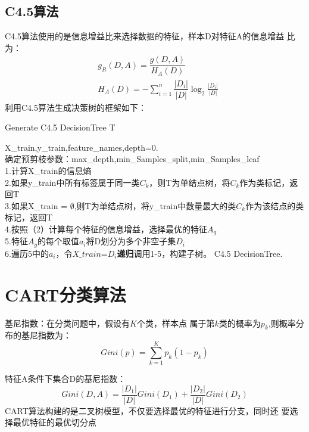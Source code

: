 \documentclass{SHUarticle}
\begin{document}
\subsection{C4.5算法}
C4.5算法使用的是信息增益比来选择数据的特征，样本D对特征A的信息增益
比为：
\begin{equation}
	\begin{aligned}
		& g_R(D,A) = \dfrac{g(D,A)}{H_A(D)}\\
		& H_A(D) = -\sum\limits_{i=1}^n \dfrac{|D_i|}{|D|}\log_2\frac{|D_i|}{|D|}
	\end{aligned}
\end{equation}
利用C4.5算法生成决策树的框架如下：
\begin{algorithm}
	\caption{Generate C4.5 DecisionTree T }
	\label{algo:ref}
	\begin{algorithmic}[1]
		\REQUIRE X\_train,y\_train,feature\_names,depth=0.  %
		\ENSURE ~\\           %
		  确定预剪枝参数：max\_depth,min\_Samples\_split,min\_Samples\_leaf\\
		\STATE
		  1.计算X\_train的信息熵\\
		  2.如果y\_train中所有标签属于同一类$C_k$，则T为单结点树，将$C_k$作为类标记，返回T\\
		  3.如果X\_train = $\emptyset$,则T为单结点树，将y\_train中数量最大的类$C_k$作为该结点的类标记，返回T\\
		  4.按照（2）计算每个特征的信息增益，选择最优的特征$A_g$\\
		  5.特征$A_g$的每个取值$a_i$将D划分为多个非空子集$D_i$\\
		  6.遍历5中的$a_i$，令$X\_train$=$D_i$\textbf{递归}调用1-5，构建子树。
		\ENDWHILE
		\RETURN C4.5 DecisionTree.  %
	\end{algorithmic}
\end{algorithm}
\section{CART分类算法}
\begin{definition}
	基尼指数：在分类问题中，假设有$K$个类，样本点
	属于第$k$类的概率为$p_k$,则概率分布的基尼指数为：
	\[Gini(p)=\sum\limits_{k=1}^Kp_k(1-p_k)\]
\end{definition}
特征A条件下集合D的基尼指数：
\[Gini(D,A)=\dfrac{|D_1|}{|D|}Gini(D_1)+\dfrac{|D_2|}{|D|}Gini(D_2)\]
CART算法构建的是二叉树模型，不仅要选择最优的特征进行分支，同时还
要选择最优特征的最优切分点
\end{document}
